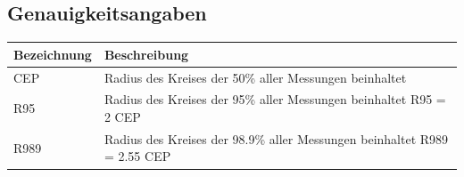 
\subsection{Genauigkeitsangaben}
\begin{tabular}{|l|l|}
	\hline
	\textbf{Bezeichnung} & \textbf{Beschreibung}\\
	\hline
	\hline
	CEP & Radius des Kreises der 50\% aller Messungen beinhaltet\\
	\hline
	R95 & Radius des Kreises der 95\% aller Messungen beinhaltet R95
	= 2 CEP\\
	\hline
	R989 & Radius des Kreises der 98.9\% aller Messungen beinhaltet R989
	= 2.55 CEP\\
	\hline
\end{tabular}
